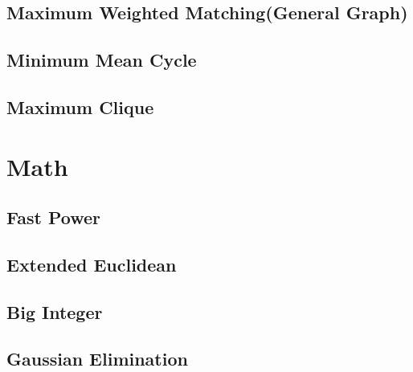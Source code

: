 \documentclass[a4paper,10pt,twocolumn,oneside]{article}
\begin{document}
\subsection{Maximum Weighted Matching(General Graph)}


\subsection{Minimum Mean Cycle}


\subsection{Maximum Clique}


%

%

\section{Math}

\subsection{Fast Power}


\subsection{Extended Euclidean}


\subsection{Big Integer}


\subsection{Gaussian Elimination}

\end{document}
